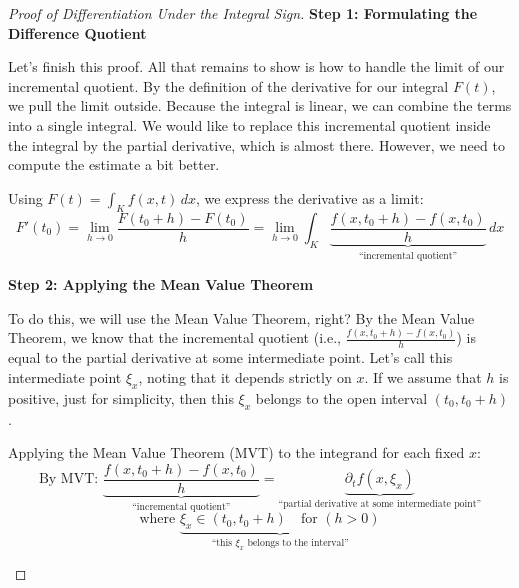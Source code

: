 \begin{proof}[Proof of Differentiation Under the Integral Sign]

\textbf{Step 1: Formulating the Difference Quotient}
\begin{spoken-clean}[00:00:09 - 00:01:20]
Let's finish this proof. All that remains to show is how to handle the limit of our incremental quotient. By the definition of the derivative for our integral $F(t)$, we pull the limit outside. Because the integral is linear, we can combine the terms into a single integral. We would like to replace this incremental quotient inside the integral by the partial derivative, which is almost there. However, we need to compute the estimate a bit better.
\end{spoken-clean}

\begin{math-stroke}
Using $F(t) = \int_K f(x,t) \, dx$, we express the derivative as a limit:
\[
F'(t_0) = \lim_{h \to 0} \frac{F(t_0+h) - F(t_0)}{h} = \lim_{h \to 0} \int_K \underbrace{\frac{f(x,t_0+h) - f(x,t_0)}{h}}_{\text{``incremental quotient''}} \, dx
\]
\end{math-stroke}

\textbf{Step 2: Applying the Mean Value Theorem}
\begin{spoken-clean}[00:01:20 - 00:02:10]
To do this, we will use the Mean Value Theorem, right? By the Mean Value Theorem, we know that the incremental quotient (i.e., $\frac{f(x, t_0 + h) - f(x, t_0)}{h}$) is equal to the partial derivative at some intermediate point. Let's call this intermediate point $\xi_x$, noting that it depends strictly on $x$. If we assume that $h$ is positive, just for simplicity, then this $\xi_x$ belongs to the open interval $(t_0, t_0 + h)$.
\end{spoken-clean}

\begin{math-stroke}
Applying the Mean Value Theorem (MVT) to the integrand for each fixed $x$:
\[
\text{By MVT: } \underbrace{\frac{f(x, t_0+h) - f(x, t_0)}{h}}_{\text{``incremental quotient''}} = \underbrace{\partial_t f(x, \xi_x)}_{\text{``partial derivative at some intermediate point''}}
\]
\[
\text{where } \underbrace{\xi_x \in (t_0, t_0+h) \quad \text{for } (h>0)}_{\text{``this } \xi_x \text{ belongs to the interval''}}
\]
\end{math-stroke}


\end{proof}
